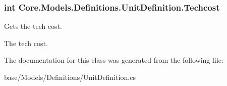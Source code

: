\subsubsection[{Techcost}]{\setlength{\rightskip}{0pt plus 5cm}int Core.\+Models.\+Definitions.\+Unit\+Definition.\+Techcost\hspace{0.3cm}{\ttfamily [get]}}\label{classCore_1_1Models_1_1Definitions_1_1UnitDefinition_a33eddf22531ef2f351a5efd21733c276}


Gets the tech cost. 

The tech cost.

The documentation for this class was generated from the following file\+:\begin{DoxyCompactItemize}
\item 
base/\+Models/\+Definitions/Unit\+Definition.\+cs\end{DoxyCompactItemize}
